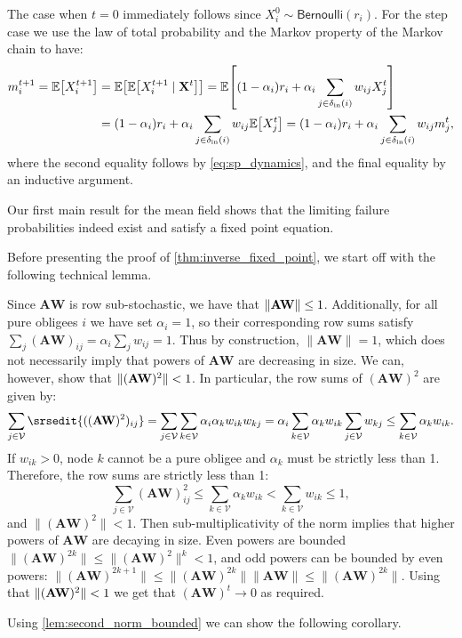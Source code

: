\documentclass[mnsc,nonblindrev]{informs3}
\newcommand{\Exp}[1]{\mathbb E \left[ #1 \right]} %
\newcommand{\din}{\delta_{\text{in}}}
\newcommand{\Xvec}{\mathbf{X}}
\newcommand{\Ber}{\textsf{Bernoulli}}
\newcommand{\A}{\mathbf{A}}
\newcommand{\W}{\mathbf{W}}
\newcommand{\mean}{m}
\DeclarePairedDelimiter{\norm}{\lVert}{\rVert}
\let\originalleft\left
\let\originalright\right
\renewcommand{\left}{\mathopen{}\mathclose\bgroup\originalleft}
\renewcommand{\right}{\aftergroup\egroup\originalright}
\renewenvironment{proof}[1][Proof]{%
  \par\noindent{\itshape #1.} \ignorespaces
}{%
  \hfill\Halmos\par
}
\begin{document}
\begin{APPENDICES}
\MeanFieldRecurrence*
\begin{proof}
The case when $t = 0$ immediately follows since $X_i^0 \sim \Ber(r_i)$.  For the step case we use the law of total probability and the Markov property of the Markov chain to have:
\begin{align*}
    m_i^{t+1} = \Exp{X_i^{t+1}} & = \Exp{\Exp{X_i^{t+1} \mid \Xvec^{t}}} = \Exp{(1 - \alpha_i) r_i + \alpha_i \sum_{j \in \din(i)} w_{ij} X_j^{t}} \\
    & = (1 - \alpha_i) r_i + \alpha_i \sum_{j \in \din(i)} w_{ij} \Exp{X_j^{t}} = (1 - \alpha_i) r_i + \alpha_i \sum_{j \in \din(i)} w_{ij} \mean_j^{t},
\end{align*}
where the second equality follows by \cref{eq:sp_dynamics}, and the final equality by an inductive argument.
\end{proof}
Our first main result for the mean field shows that the limiting failure probabilities indeed exist and satisfy a fixed point equation.

\InverseFixedPoint*
Before presenting the proof of \cref{thm:inverse_fixed_point}, we start off with the following technical lemma.

\SecondNormBounded*
\begin{proof}
    Since $\A\W$ is row sub-stochastic, we have that $\norm{\A\W} \leq 1$.  Additionally, for all pure obligees $i$ we have set $\alpha_i=1$, so their corresponding row sums satisfy $\sum_j (\A\W)_{ij} = \alpha_i \sum_j w_{ij} = 1$.  Thus by construction, $\|\A\W\|=1$, which does not necessarily imply that powers of $\A\W$ are decreasing in size.
    We can, however, show that $\norm{(\A\W)^2}<1$.  In particular, the row sums of $(\A\W)^2$ are given by:
    \begin{equation*}
        \sum_{j\in\mathcal{V}} \srsedit{((\A\W)^2)_{ij}} = \sum_{j\in\mathcal{V}} \sum_{k\in\mathcal{V}} \alpha_i \alpha_k w_{ik} w_{kj} = \alpha_i \sum_{k\in\mathcal{V}} \alpha_k w_{ik} \sum_{j\in\mathcal{V}} w_{kj} \leq \sum_{k\in\mathcal{V}} \alpha_k w_{ik}.
    \end{equation*}
    If $w_{ik}>0$, node $k$ cannot be a pure obligee and $\alpha_k$ must be strictly less than 1.
    Therefore, the row sums are strictly less than 1:
    \begin{equation*}
        \sum_{j\in\mathcal{V}} (\A\W)^2_{ij} \leq \sum_{k\in\mathcal{V}} \alpha_k w_{ik} < \sum_{k\in\mathcal{V}} w_{ik} \leq 1,
    \end{equation*}
    and $\|(\A\W)^2\|<1$.
    Then sub-multiplicativity of the norm implies that higher powers of $\A\W$ are decaying in size.
    Even powers are bounded $\|(\A\W)^{2k}\| \leq \|(\A\W)^2\|^k < 1$, and odd powers can be bounded by even powers: $\|(\A\W)^{2k+1}\| \leq \|(\A\W)^{2k}\|\|\A\W\| \leq \|(\A\W)^{2k}\|.$  Using that $\norm{(\A\W)^2} < 1$ we get that $(\A\W)^t \rightarrow 0$ as required.
\end{proof}
Using \cref{lem:second_norm_bounded} we can show the following corollary.


\end{APPENDICES}
\end{document}
